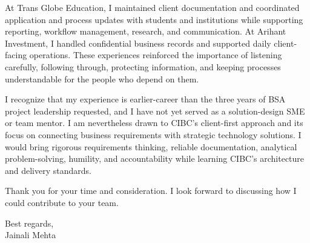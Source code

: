 \documentclass[letterpaper,11pt]{article}
\begin{document}
\bigbreak
At Trans Globe Education, I maintained client documentation and coordinated application and process updates with students and institutions while supporting reporting, workflow management, research, and communication. At Arihant Investment, I handled confidential business records and supported daily client-facing operations. These experiences reinforced the importance of listening carefully, following through, protecting information, and keeping processes understandable for the people who depend on them.

\bigbreak
I recognize that my experience is earlier-career than the three years of BSA project leadership requested, and I have not yet served as a solution-design SME or team mentor. I am nevertheless drawn to CIBC's client-first approach and its focus on connecting business requirements with strategic technology solutions. I would bring rigorous requirements thinking, reliable documentation, analytical problem-solving, humility, and accountability while learning CIBC's architecture and delivery standards.

\bigbreak
Thank you for your time and consideration. I look forward to discussing how I could contribute to your team.

\bigbreak
Best regards,\\
Jainali Mehta
\end{document}
